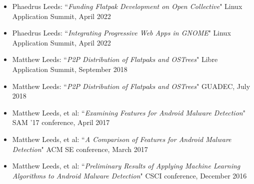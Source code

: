 \documentclass[11pt]{article}
\begin{document}
\begin{itemize}[itemindent=0em]
  \item Phaedrus Leeds: ``\textit{Funding Flatpak Development on Open Collective}"\newline
        Linux Application Summit, April 2022
  \item Phaedrus Leeds: ``\textit{Integrating Progressive Web Apps in GNOME}"\newline
        Linux Application Summit, April 2022
  \item Matthew Leeds: ``\textit{P2P Distribution of Flatpaks and OSTrees}"\newline
        Libre Application Summit, September 2018
  \item Matthew Leeds: ``\textit{P2P Distribution of Flatpaks and OSTrees}"\newline
        GUADEC, July 2018
  \item Matthew Leeds, et al: ``\textit{Examining Features for Android Malware Detection}"\newline
        SAM '17 conference, April 2017
  \item Matthew Leeds, et al: ``\textit{A Comparison of Features for Android Malware Detection}"\newline
        ACM SE conference, March 2017
  \item Matthew Leeds, et al: ``\textit{Preliminary Results of Applying Machine Learning Algorithms to Android Malware Detection}"\newline
        CSCI conference, December 2016
\end{itemize}
\end{document}
